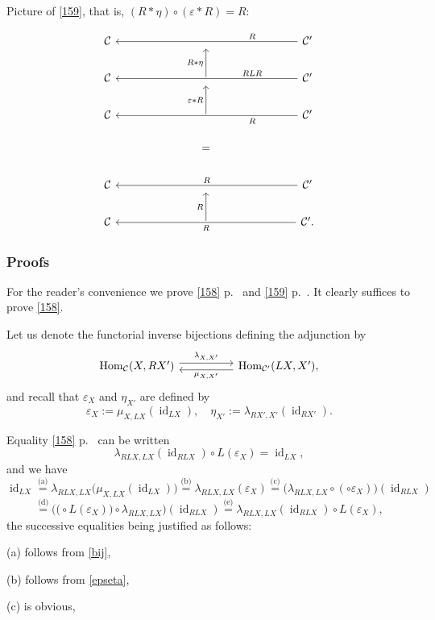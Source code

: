 \documentclass[12pt]{article}%
\theoremstyle{remark}
\theoremstyle{definition}
\newcommand{\C}{\mathcal C}
\newcommand{\ee}{\varepsilon}
\DeclareMathOperator{\id}{id}
\DeclareMathOperator{\Hom}{Hom}%
\begin{document}
Picture of \eqref{159}, that is, $(R*\eta)\circ(\ee*R)=R$:

$$
\begin{tikzcd}
%
\C&&&{}&&&\C'\ar{llllll}[near start,swap]{R}\\
%
\C&&&\ar{u}{R*\eta}&&&\C'\ar{llllll}[near start,swap]{RLR}\\
%
\C&&&\ar{u}{\ee*R}&&&\C'\ar{llllll}[near start]{R}\\ 
%
&&&=\\ 
%
\C&&&{}&&&\C'\ar{llllll}[swap]{R}\\ 
%
\C&&&\ar{u}{R}&&&\C'.\ar{llllll}{R}
%
\end{tikzcd}
$$

\subsubsection{Proofs}

For the reader's convenience we prove \eqref{158} p.~\pageref{158} and \eqref{159} p.~\pageref{159}. It clearly suffices to prove \eqref{158}. 

Let us denote the functorial inverse bijections defining the adjunction by 
%
\begin{equation}\label{bij}
\begin{tikzcd}
\Hom_\C(X,RX')\ar[yshift=0.7ex]{rr}{\lambda_{X,X'}}&&\Hom_{\C'}(LX,X'),\ar[yshift=-0.7ex]{ll}{\mu_{X,X'}}
\end{tikzcd}
\end{equation} 
%
and recall that $\ee_X$ and $\eta_{X'}$ are defined by
%
\begin{equation}\label{epseta}
\ee_X:=\mu_{X,LX}(\id_{LX}),\quad\eta_{X'}:=\lambda_{RX',X'}(\id_{RX'}).
\end{equation}

Equality \eqref{158} p.~\pageref{158} can be written 
$$
\lambda_{RLX,LX}(\id_{RLX})\circ L(\ee_X)=\id_{LX},
$$ 
and we have 
$$
\id_{LX}\overset{\text{(a)}}{=}\lambda_{RLX,LX}\big(\mu_{X,LX}(\id_{LX})\big)\overset{\text{(b)}}{=}\lambda_{RLX,LX}(\ee_X)\overset{\text{(c)}}{=}\big(\lambda_{RLX,LX}\circ(\circ\ee_X)\big)(\id_{RLX})
$$
$$
\overset{\text{(d)}}{=}\Big(\big(\circ L(\ee_X)\big)\circ\lambda_{RLX,LX}\Big)(\id_{RLX})\overset{\text{(e)}}{=}\lambda_{RLX,LX}(\id_{RLX})\circ L(\ee_X),
$$ 
the successive equalities being justified as follows:

(a) follows from \eqref{bij},

(b) follows from \eqref{epseta},

(c) is obvious,
\end{document}
